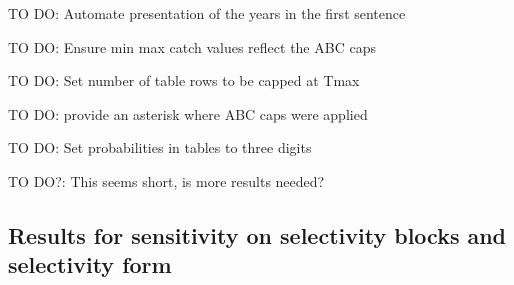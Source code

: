 \documentclass[11pt,
  english,
  a4paper,
]{article}
\begin{document}
TO DO: Automate presentation of the years in the first sentence

\leavevmode\tagmcend\tagstructend\par


TO DO: Ensure min max catch values reflect the ABC caps

\leavevmode\tagmcend\tagstructend\par


TO DO: Set number of table rows to be capped at Tmax

\leavevmode\tagmcend\tagstructend\par


TO DO: provide an asterisk where ABC caps were applied

\leavevmode\tagmcend\tagstructend\par


TO DO: Set probabilities in tables to three digits

\leavevmode\tagmcend\tagstructend\par


TO DO?: This seems short, is more results needed?

\leavevmode\tagmcend\tagstructend\par


\hypertarget{results-for-sensitivity-on-selectivity-blocks-and-selectivity-form}{%
\subsection{Results for sensitivity on selectivity blocks and selectivity form}\label{results-for-sensitivity-on-selectivity-blocks-and-selectivity-form}}

\leavevmode\tagmcend\tagstructend

\end{document}
